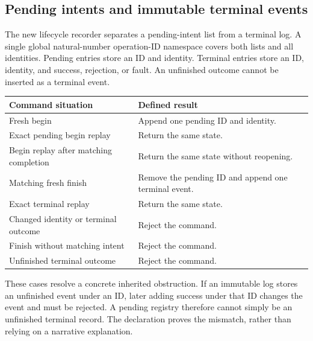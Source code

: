 \subsection{Pending intents and immutable terminal events}

The new lifecycle recorder separates a pending-intent list from a terminal log.
A single global natural-number operation-ID namespace covers both lists and
all identities. Pending entries store an ID and identity. Terminal entries
store an ID, identity, and success, rejection, or fault. An unfinished outcome
cannot be inserted as a terminal event.

\begin{center}
\begin{tabularx}{\linewidth}{@{}lX@{}}
\toprule
Command situation & Defined result\\\midrule
Fresh begin & Append one pending ID and identity.\\
Exact pending begin replay & Return the same state.\\
Begin replay after matching completion & Return the same state without reopening.\\
Matching fresh finish & Remove the pending ID and append one terminal event.\\
Exact terminal replay & Return the same state.\\
Changed identity or terminal outcome & Reject the command.\\
Finish without matching intent & Reject the command.\\
Unfinished terminal outcome & Reject the command.\\
\bottomrule
\end{tabularx}
\end{center}

These cases resolve a concrete inherited obstruction. If an immutable log stores
an unfinished event under an ID, later adding success under that ID changes the
event and must be rejected. A pending registry therefore cannot simply be an
unfinished terminal record. The declaration
 proves the mismatch, rather
than relying on a narrative explanation.

